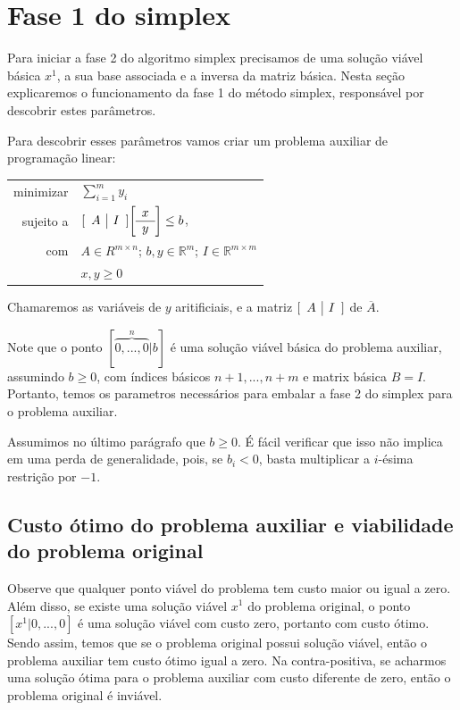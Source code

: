 \documentclass[12pt]{article}
\begin{document}
    
    
\section{Fase 1 do simplex}
	Para iniciar a fase 2 do algoritmo simplex precisamos de uma solução viável básica $x^1$, a sua base associada e a inversa da matriz básica. Nesta seção explicaremos o funcionamento da fase 1 do método simplex, responsável por descobrir estes parâmetros.

Para descobrir esses parâmetros vamos criar um problema auxiliar de programação linear:

\begin{center}
	\begin{tabular}{r l}
		minimizar & $\sum_{i = 1}^{m} y_i$ \\
		sujeito a & $
					[\begin{array}{c | c}
						A & I
					\end{array}]
					
					\bigg[\begin{array}{c}
						x \\
						\hline
						y
					\end{array}\bigg]
					
					\leq b$, \\
			com   &	$A \in R^{m \times n}$; $b, y \in \mathbb{R}^m$; $I \in \mathbb{R}^{m \times m}$ \\
            & $x, y \geq 0$
	\end{tabular}
\end{center}
Chamaremos as variáveis de $y$ aritificiais, e a matriz $[\begin{array}{c | c} A & I	\end{array}]$ de $\overline{A}$.

Note que o ponto $[\overbrace{0, ..., 0}^{n}|b]$ é uma solução viável básica do problema auxiliar, assumindo $b \geq 0$, com índices básicos $n + 1, ..., n + m$ e matrix básica $B = I$. Portanto, temos os parametros necessários para embalar a fase 2 do simplex para o problema auxiliar.

Assumimos no último parágrafo que $b \geq 0$. É fácil verificar que isso não implica em uma perda de generalidade, pois, se $b_i < 0$, basta multiplicar a $i$-ésima restrição por $-1$.



\subsection{Custo ótimo do problema auxiliar e viabilidade do problema original}
\label{fase2:custo_otimo}
Observe que qualquer ponto viável do problema tem custo maior ou igual a zero. Além disso, se existe uma solução viável $x^1$ do problema original, o ponto $[x^1 | 0, ..., 0]$ é uma solução viável com custo zero, portanto com custo ótimo. Sendo assim, temos que se o problema original possui solução viável, então o problema auxiliar tem custo ótimo igual a zero. Na contra-positiva, se acharmos uma solução ótima para o problema auxiliar com custo diferente de zero, então o problema original é inviável.
\end{document}
